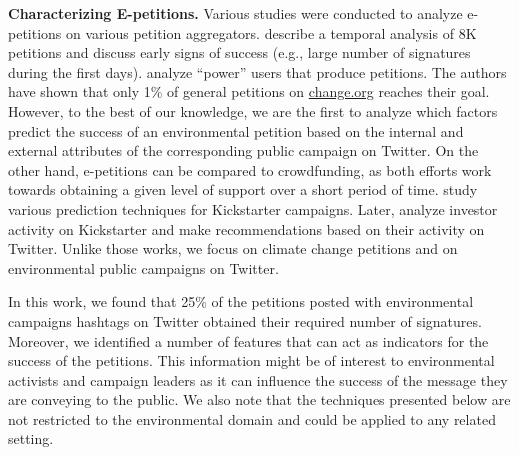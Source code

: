 \textbf{Characterizing E-petitions.} Various studies were conducted to analyze e-petitions on various petition aggregators.
\citeauthor{Hale2013}  describe a temporal analysis of 8K petitions and discuss early signs of success (e.g., large number of signatures during the first days).
\citeauthor{Huang2015}  analyze ``power'' users that produce petitions. The authors have shown that only 1\% of general petitions on \url{change.org} reaches their goal.
However, to the best of our knowledge, we are the first to analyze which factors predict the success of an environmental petition based on the internal and external attributes of the corresponding public campaign on Twitter.
On the other hand, e-petitions can be compared to crowdfunding, as both efforts work towards obtaining a given level of support over a short period of time.
\citeauthor{Etter2013}  study various prediction techniques for Kickstarter campaigns.
Later, \citeauthor{An2014}  analyze investor activity on Kickstarter and make recommendations based on their activity on Twitter. Unlike those works, we focus on climate change  petitions and on environmental public campaigns on Twitter.


In this work, we found that 25\% of the petitions posted with environmental campaigns hashtags on Twitter obtained their required number of signatures.
Moreover, we identified a number of features that can act as indicators for the success of the petitions.
This information might be of interest to environmental activists and campaign leaders as it can influence the success of the message they are conveying to the public.
We also note that the techniques presented below are not restricted to the environmental domain and could be applied to any related setting.

